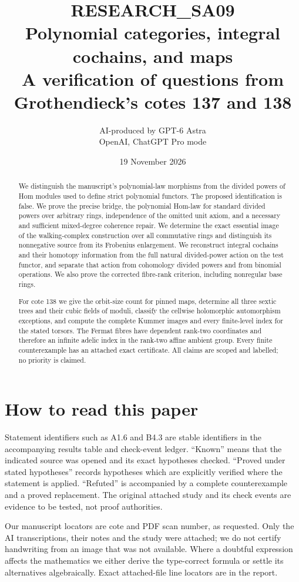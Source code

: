 \documentclass[11pt,a4paper]{article}
\title{\textsf{RESEARCH\_SA09}\\[0.4em]
 Polynomial categories, integral cochains, and maps\\[0.3em]
 \large A verification of questions from Grothendieck's cotes 137 and 138}
\author{AI-produced by GPT-6 Astra\\
 \small OpenAI, ChatGPT Pro mode}
\date{19 November 2026}
\begin{document}
\maketitle
\begin{abstract}
We distinguish the manuscript's polynomial-law morphisms from the
divided powers of Hom modules used to define strict polynomial functors.
The proposed identification is false. We prove the precise bridge,
the polynomial Hom-law for standard divided powers over arbitrary
rings, independence of the omitted unit axiom, and a necessary and
sufficient mixed-degree coherence repair. We determine the exact
essential image of the walking-complex construction over all
commutative rings and distinguish its nonnegative source from its
Frobenius enlargement. We reconstruct integral cochains and their
homotopy information from the full natural divided-power action on
the test functor, and separate that action from cohomology divided
powers and from binomial operations. We also prove the corrected
fibre-rank criterion, including nonregular base rings.

For cote 138 we give the orbit-size count for pinned maps, determine
all three sextic trees and their cubic fields of moduli, classify
the cellwise holomorphic automorphism exceptions, and compute the
complete Kummer images and every finite-level index for the stated
torsors. The Fermat fibres have dependent rank-two coordinates and
therefore an infinite adelic index in the rank-two affine ambient
group. Every finite counterexample has an attached exact certificate.
All claims are scoped and labelled; no priority is claimed.
\end{abstract}

\section*{How to read this paper}
Statement identifiers such as A1.6 and B4.3 are stable identifiers in
the accompanying results table and check-event ledger. ``Known'' means
that the indicated source was opened and its exact hypotheses checked.
``Proved under stated hypotheses'' records hypotheses which are
explicitly verified where the statement is applied. ``Refuted'' is
accompanied by a complete counterexample and a proved replacement.
The original attached study and its check events are evidence to be
tested, not proof authorities.

Our manuscript locators are cote and PDF scan number, as requested.
Only the AI transcriptions, their notes and the study were attached;
we do not certify handwriting from an image that was not available.
Where a doubtful expression affects the mathematics we either derive
the type-correct formula or settle its alternatives algebraically.
Exact attached-file line locators are in the report.
\end{document}
